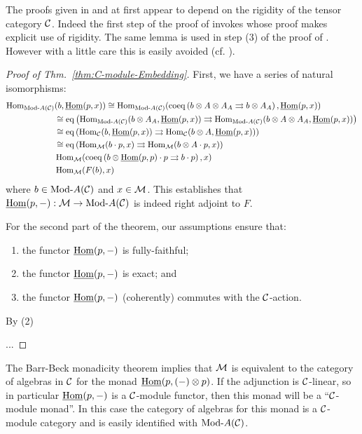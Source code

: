 \documentclass{amsart}
\begin{document}
\noindent The proofs given in \cite{EGNO} and \cite{MR1976459} at first appear to depend on  the rigidity of the tensor category $\mathcal C$. Indeed the first step of the proof of \cite[Thm 2.11.2]{EGNO} invokes \cite[lemma 2.10.4.(4)]{EGNO} whose proof makes explicit use of rigidity. The same lemma is used in step (3) of the proof of \cite[Thm 1]{MR1976459}. However with a little care this is easily avoided (cf. \cite[Rmk. 2.11.3]{EGNO}). 

\begin{proof}[Proof of Thm.~\ref{thm:C-module-Embedding}]
	First, we have a series of natural isomorphisms:
	\begin{align*}
		\Hom_{\Mod{}{A}(\cC)}&(b, \IHom(p,x))  \cong \Hom_{\Mod{}{A}(\cC)}( \coeq \left( b \otimes A \otimes A_A \rightrightarrows b \otimes A_A  \right), \IHom(p,x)) \\
		& \cong \eq \left( \Hom_{\Mod{}{A}(\cC)}(b \otimes A_A, \IHom(p,x) )  \rightrightarrows \Hom_{\Mod{}{A}(\cC)}(  b \otimes A \otimes A_A, \IHom(p,x))  \right) \\
		& \cong \eq \left( \Hom_{\cC}(b, \IHom(p,x) )  \rightrightarrows \Hom_{\cC}(  b \otimes A, \IHom(p,x))  \right) \\
		& \cong \eq \left( \Hom_{\cM}(b \cdot p, x )  \rightrightarrows \Hom_{\cM}(  b \otimes A \cdot p, x)  \right) \\
		& \Hom_{\cM}( \coeq \left( b \otimes \IHom(p,p) \cdot p \rightrightarrows b \cdot p \right), x) \\
		& \Hom_{\cM}( F(b), x)
	\end{align*}
	where $b \in \Mod{}{A}(\cC)$ and $x \in \mathcal M$. This establishes that $\IHom(p,-): \cM \to \Mod{}{A}(\cC)$ is indeed right adjoint to $F$.

For the second part of the theorem, our assumptions ensure that:
\begin{enumerate}
	\item the functor $\operatorname{\underline{Hom}}(p, -)$ is fully-faithful;
	\item the functor $\operatorname{\underline{Hom}}(p, -)$ is exact; and
	\item the functor $\operatorname{\underline{Hom}}(p, -)$ (coherently) commutes with the $\mathcal C$-action. 
\end{enumerate}	

By (2)	
	
...	
\end{proof}

The Barr-Beck monadicity theorem implies that $\mathcal M$ is equivalent to the category of algebras in $\mathcal C$ for the monad $\operatorname{\underline{Hom}}(p, (-) \otimes p)$. If the adjunction is $\mathcal C$-linear, so in particular $\operatorname{\underline{Hom}}(p,-)$ is a $\mathcal C$-module functor, then this monad will be a ``$\mathcal C$-module monad''. In this case the category of algebras for this monad is a $\mathcal C$-module category and is easily identified with $\Mod{}{A}(\cC)$. 
\end{document}
